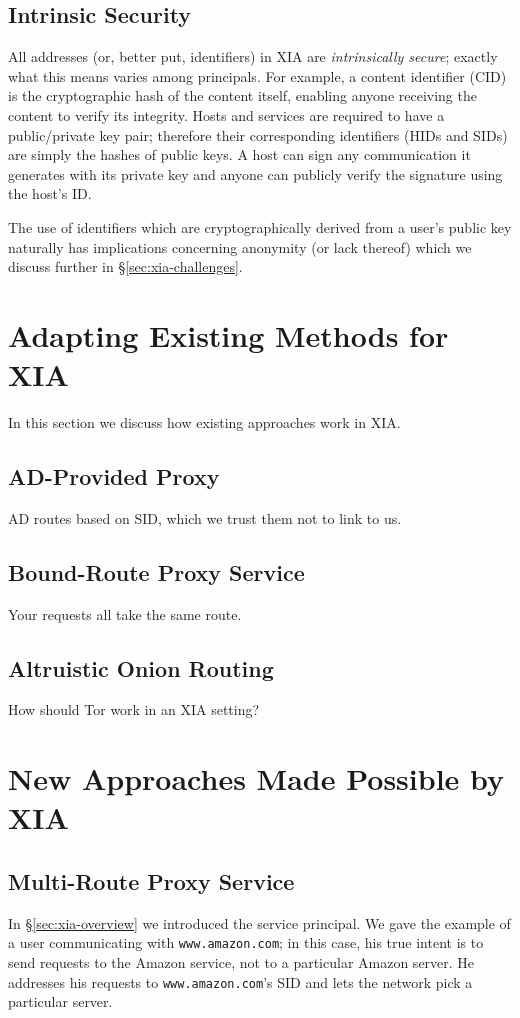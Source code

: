 \documentclass{article}
\begin{document}
\subsection{Intrinsic Security}
All addresses (or, better put, identifiers) in XIA are \emph{intrinsically secure}; exactly what this means varies among principals. For example, a content identifier (CID) is the cryptographic hash of the content itself, enabling anyone receiving the content to verify its integrity. Hosts and services are required to have a public/private key pair; therefore their corresponding identifiers (HIDs and SIDs) are simply the hashes of public keys. A host can sign any communication it generates with its private key and anyone can publicly verify the signature using the host's ID.

The use of identifiers which are cryptographically derived from a user's public key naturally has implications concerning anonymity (or lack thereof) which we discuss further in \S\ref{sec:xia-challenges}.


\section{Adapting Existing Methods for XIA}
In this section we discuss how existing approaches work in XIA.
\subsection{AD-Provided Proxy}
AD routes based on SID, which we trust them not to link to us.
\subsection{Bound-Route Proxy Service}
Your requests all take the same route.
\subsection{Altruistic Onion Routing}
How should Tor work in an XIA setting?


\section{New Approaches Made Possible by XIA}
\subsection{Multi-Route Proxy Service}
In \S\ref{sec:xia-overview} we introduced the service principal. We gave the example of a user communicating with \texttt{www.amazon.com}; in this case, his true intent is to send requests to the Amazon service, not to a particular Amazon server. He addresses his requests to \texttt{www.amazon.com}'s SID and lets the network pick a particular server.
\end{document}
